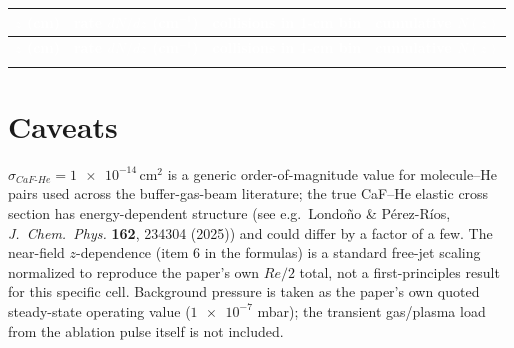\documentclass[11pt]{article}
\newcommand{\hdr}[1]{\textcolor{white}{\textbf{#1}}}
\begin{document}
\begin{longtable}{@{}>{\raggedleft\arraybackslash}p{1.6cm} >{\raggedleft\arraybackslash}p{3.6cm} >{\raggedleft\arraybackslash}p{3.6cm} >{\raggedleft\arraybackslash}p{3cm}@{}}
\toprule
\rowcolor{hdrblue}
\hdr{$z$ (cm)} & \hdr{rate $dN/dz$ (cm$^{-1}$)} & \hdr{collisions in 1-cm bin} & \hdr{cumulative $N(z)$} \\
\midrule
\endfirsthead
\toprule
\rowcolor{hdrblue}
\hdr{$z$ (cm)} & \hdr{rate $dN/dz$ (cm$^{-1}$)} & \hdr{collisions in 1-cm bin} & \hdr{cumulative $N(z)$} \\
\midrule
\endhead
\bottomrule
\endfoot

\end{longtable}

\section*{Caveats}
$\sigma_{CaF\text{-}He} = \num{1e-14}\,\text{cm}^2$ is a generic order-of-magnitude value for
molecule--He pairs used across the buffer-gas-beam literature; the true CaF--He elastic cross section
has energy-dependent structure (see e.g.\ Londo\~no \& P\'erez-R\'ios, \textit{J.\ Chem.\ Phys.}
\textbf{162}, 234304 (2025)) and could differ by a factor of a few. The near-field $z$-dependence
(item 6 in the formulas) is a standard free-jet scaling normalized to reproduce the paper's own $Re/2$
total, not a first-principles result for this specific cell. Background pressure is taken as the
paper's own quoted steady-state operating value ($\num{1e-7}$ mbar); the transient gas/plasma load from
the ablation pulse itself is not included.
\end{document}
